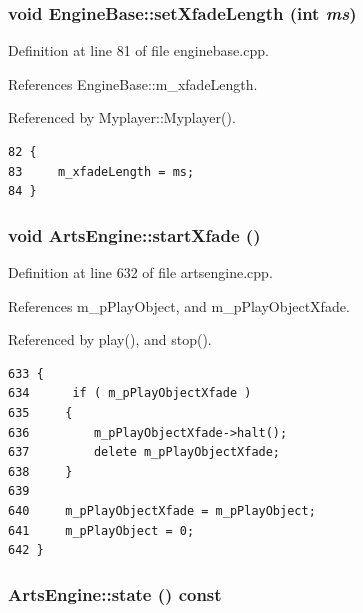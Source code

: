 \subsubsection{\setlength{\rightskip}{0pt plus 5cm}void Engine\-Base::set\-Xfade\-Length (int {\em ms})\hspace{0.3cm}{\tt  [virtual, inherited]}}\label{classEngineBase_EngineBasea24}




Definition at line 81 of file enginebase.cpp.

References Engine\-Base::m\_\-xfade\-Length.

Referenced by Myplayer::Myplayer().



\footnotesize\begin{verbatim}82 {
83     m_xfadeLength = ms;
84 }
\end{verbatim}\normalsize 
{}
\subsubsection{\setlength{\rightskip}{0pt plus 5cm}void Arts\-Engine::start\-Xfade ()\hspace{0.3cm}{\tt  [private]}}\label{classArtsEngine_ArtsEngined0}




Definition at line 632 of file artsengine.cpp.

References m\_\-p\-Play\-Object, and m\_\-p\-Play\-Object\-Xfade.

Referenced by play(), and stop().



\footnotesize\begin{verbatim}633 {
634      if ( m_pPlayObjectXfade )
635     {
636         m_pPlayObjectXfade->halt();
637         delete m_pPlayObjectXfade;
638     }
639 
640     m_pPlayObjectXfade = m_pPlayObject;
641     m_pPlayObject = 0;
642 }
\end{verbatim}\normalsize 
{}
\subsubsection{ Arts\-Engine::state () const\hspace{0.3cm}{\tt  [virtual]}}\label{classArtsEngine_ArtsEnginea7}




